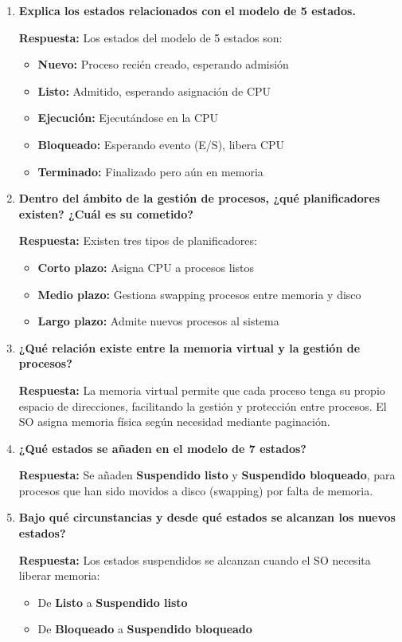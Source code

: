 \documentclass[a4paper,12pt]{article}
\begin{document}
\begin{enumerate}[label=\textbf{Pregunta \arabic*.},left=0pt,itemsep=1.5em]
\item \textbf{Explica los estados relacionados con el modelo de 5 estados.}

\textbf{Respuesta:} Los estados del modelo de 5 estados son:
\begin{itemize}
    \item \textbf{Nuevo:} Proceso recién creado, esperando admisión
    \item \textbf{Listo:} Admitido, esperando asignación de CPU
    \item \textbf{Ejecución:} Ejecutándose en la CPU
    \item \textbf{Bloqueado:} Esperando evento (E/S), libera CPU
    \item \textbf{Terminado:} Finalizado pero aún en memoria
\end{itemize}

\item \textbf{Dentro del ámbito de la gestión de procesos, ¿qué planificadores existen? ¿Cuál es su cometido?}

\textbf{Respuesta:} Existen tres tipos de planificadores:
\begin{itemize}
    \item \textbf{Corto plazo:} Asigna CPU a procesos listos
    \item \textbf{Medio plazo:} Gestiona swapping procesos entre memoria y disco
    \item \textbf{Largo plazo:} Admite nuevos procesos al sistema
\end{itemize}

\item \textbf{¿Qué relación existe entre la memoria virtual y la gestión de procesos?}

\textbf{Respuesta:} La memoria virtual permite que cada proceso tenga su propio espacio de direcciones, facilitando la gestión y protección entre procesos. El SO asigna memoria física según necesidad mediante paginación.

\item \textbf{¿Qué estados se añaden en el modelo de 7 estados?}

\textbf{Respuesta:} Se añaden \textbf{Suspendido listo} y \textbf{Suspendido bloqueado}, para procesos que han sido movidos a disco (swapping) por falta de memoria.

\item \textbf{Bajo qué circunstancias y desde qué estados se alcanzan los nuevos estados?}

\textbf{Respuesta:} Los estados suspendidos se alcanzan cuando el SO necesita liberar memoria:
\begin{itemize}
    \item De \textbf{Listo} a \textbf{Suspendido listo}
    \item De \textbf{Bloqueado} a \textbf{Suspendido bloqueado}
\end{itemize}


\end{enumerate}
\end{document}
